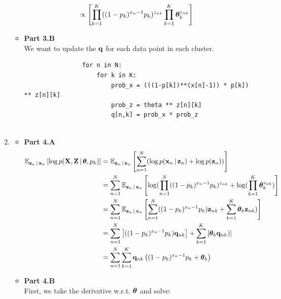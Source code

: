 \documentclass[submit]{harvardml}
\begin{document}
\begin{enumerate}
\begin{itemize}
\begin{equation}
\begin{split}
                        &\propto \left[\prod^K_{k=1}((1-p_k)^{x_n-1}p_k)^{z_{nk}}\prod^K_{k=1}\boldsymbol{\theta}^{z_{nk}}_k\right]
                    \end{split}
                \end{equation}
            \item \textbf{Part 3.B}\\
            We want to update the $\mathbf{q}$ for each data point in each cluster.
                \begin{verbatim}
                for n in N:
                    for k in K:
                        prob_x = (((1-p[k])**(x[n]-1)) * p[k]) ** z[n][k]
                        prob_z = theta ** z[n][k]
                        q[n,k] = prob_x * prob_z
                        
                \end{verbatim}
        \end{itemize}
    \item 
        \begin{itemize}
            \item \textbf{Part 4.A}
                \begin{equation}
                    \begin{split}
                    \mathbb{E}_{\mathbf{z}_n \,|\, \mathbf{x}_n}\left[ \log p(\mathbf{X}, \mathbf{Z} \,|\, \boldsymbol{\theta}, p_k)\right] &= \mathbb{E}_{\mathbf{z}_n \,|\, \mathbf{x}_n}\left[ \sum^N_{n=1}(\log p(\mathbf{x}_n \,|\, \mathbf{z}_n) + \log p(\mathbf{z}_n))\right]\\
                        &= \sum^N_{n=1}\mathbb{E}_{\mathbf{z}_n \,|\, \mathbf{x}_n}\left[\log ( \prod^N_{n=1} ((1-p_k)^{x_n-1}p_k)^{z_{nk}} + \log(\prod^K_{k=1} \boldsymbol{\theta}_k^{z_{nk}})\right]\\
                        &= \sum^N_{n=1}\mathbb{E}_{\mathbf{z}_n \,|\, \mathbf{x}_n}\left[\sum^N_{n=1} ((1-p_k)^{x_n-1}p_k) \mathbf{z}_{nk} + \sum^K_{k=1} \boldsymbol{\theta}_k \mathbf{z}_{nk})\right]\\
                        &= \sum^N_{n=1}\left[ ((1-p_k)^{x_n-1}p_k) \mathbf{q}_{nk}\right] + \sum^K_{k=1} \left[\boldsymbol{\theta}_k \mathbf{q}_{nk})\right]\\
                        &= \sum^N_{n=1} \sum^K_{k=1} \mathbf{q}_{nk} \left((1-p_k)^{x_n-1}p_k + \boldsymbol{\theta}_k\right)
                    \end{split}
                \end{equation}
            \item \textbf{Part 4.B}\\
                First, we take the derivative w.r.t. $\boldsymbol{\theta}$ and solve:

\end{itemize}
\end{enumerate}
\end{document}
